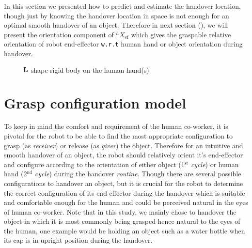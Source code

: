 In this section we presented how to predict and estimate the handover location, though just by knowing the handover location in space is not enough for an optimal smooth handover of an object. Therefore in next section (), we will present the orientation component of ${}^{h}{X}_{\text{ef}}$ which gives the graspable relative orientation of robot end-effector \texttt{w.r.t} human hand or object orientation during handover.


\begin{figure}[htpb]
	\caption{${\bf L}$ shape rigid body on the human hand(s)}
	\label{fig:lshapes}
\end{figure}


\section{Grasp configuration model}\label{orientation_model}

To keep in mind the comfort and requirement of the human co-worker, it is pivotal for the robot to be able to find the most appropriate configuration to grasp (as \textit{receiver}) or release (as \textit{giver}) the object. Therefore for an intuitive and smooth handover of an object, the robot should relatively orient it's end-effector and configure according to the orientation of either object (1$^\text{st}$ \textit{cycle}) or human hand (2$^\text{nd}$ \textit{cycle}) during the handover \textit{routine}. Though there are several possible configurations to handover an object, but it is crucial for the robot to determine the correct configuration of its end-effector during the handover which is suitable and comfortable enough for the human and could be perceived natural in the eyes of human co-worker. Note that in this study, we mainly chose to handover the object in which it is most commonly being grasped hence natural to the eyes of the human, one example would be holding an object such as a water bottle when its cap is in upright position during the handover. 

